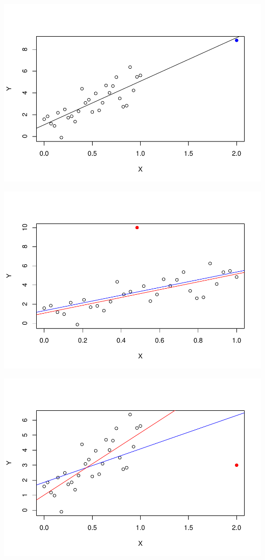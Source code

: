\documentclass[
]{book}
\begin{document}
\includegraphics{13-MultipleLinearRegression_files/figure-latex/unnamed-chunk-14-1.pdf}

\includegraphics{13-MultipleLinearRegression_files/figure-latex/unnamed-chunk-15-1.pdf}

\includegraphics{13-MultipleLinearRegression_files/figure-latex/unnamed-chunk-16-1.pdf}
\end{document}
